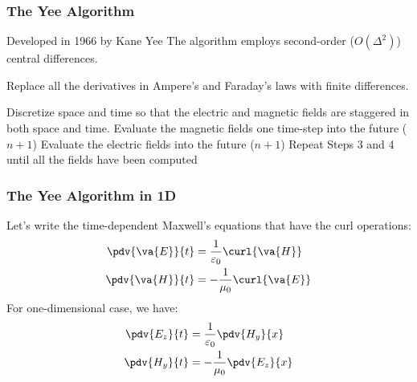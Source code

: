 \documentclass[10pt]{beamer}
\newcommand{\E}{\varepsilon}  %
\renewcommand{\u}{\mu}  %
\begin{document}
\begin{frame}
    \frametitle{The Yee Algorithm}
    \begin{outline}
        \1 Developed in 1966 by Kane Yee
        \1 The algorithm employs second-order ($O(\Delta^2)$) central differences.
    \end{outline}
    \begin{outline}[enumerate]
        \1 Replace all the derivatives in Ampere’s and Faraday’s laws with finite differences.

        \2 Discretize space and time so that the electric and magnetic fields are staggered in both space and time.
        \1 Evaluate the magnetic fields one time-step into the future ($n+1$)
        \1 Evaluate the electric fields into the future ($n +  1$)
        \1 Repeat Steps 3 and 4 until all the fields have been computed
    \end{outline}
\end{frame}

\begin{frame}
    \frametitle{The Yee Algorithm in 1D}
    Let's write the time-dependent Maxwell's equations that have the curl operations:
    \begin{align*}
        \pdv{\va{E}}{t} & = \frac{1}{\E_0} \curl{\va{H}}  \\
        \pdv{\va{H}}{t} & = -\frac{1}{\u_0} \curl{\va{E}}
    \end{align*}
    For one-dimensional case, we have:
    \begin{align*}
        \pdv{{E_z}}{t} & = \frac{1}{\E_0} \pdv{H_y}{x}  \\
        \pdv{{H_y}}{t} & = -\frac{1}{\u_0} \pdv{E_z}{x}
    \end{align*}


\end{frame}
\end{document}
